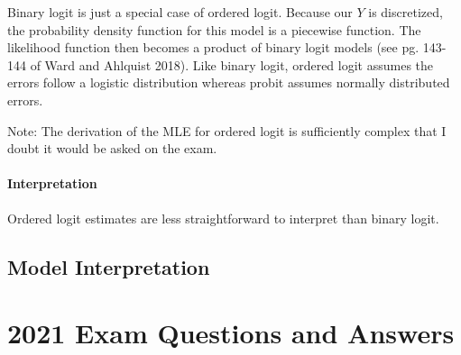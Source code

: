 \documentclass[
]{article}
\begin{document}
Binary logit is just a special case of ordered logit. Because our \(Y\)
is discretized, the probability density function for this model is a
piecewise function. The likelihood function then becomes a product of
binary logit models (see pg. 143-144 of Ward and Ahlquist 2018). Like
binary logit, ordered logit assumes the errors follow a logistic
distribution whereas probit assumes normally distributed errors.

Note: The derivation of the MLE for ordered logit is sufficiently
complex that I doubt it would be asked on the exam.

\hypertarget{interpretation}{%
\paragraph{Interpretation}\label{interpretation}}

Ordered logit estimates are less straightforward to interpret than
binary logit.

\hypertarget{model-interpretation}{%
\subsection{Model Interpretation}\label{model-interpretation}}

\hypertarget{exam-questions-and-answers}{%
\section{2021 Exam Questions and
Answers}\label{exam-questions-and-answers}}
\end{document}
